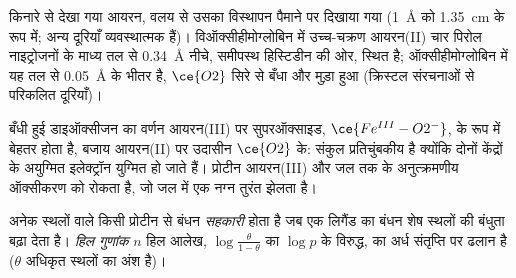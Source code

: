 \begin{omfigure}

{\small किनारे से देखा गया  आयरन, वलय से उसका विस्थापन पैमाने पर
दिखाया गया (1~\AA{} को 1.35~cm के रूप में; अन्य दूरियाँ व्यवस्थात्मक हैं)। विऑक्सीहीमोग्लोबिन में उच्च-चक्रण आयरन(II)
चार पिरोल नाइट्रोजनों के माध्य तल से \qty{0.34}{\angstrom} नीचे,
समीपस्थ हिस्टिडीन की ओर, स्थित है; ऑक्सीहीमोग्लोबिन में यह तल से \qty{0.05}{\angstrom} के भीतर है, $\ce{O2}$
सिरे से बँधा और मुड़ा हुआ (क्रिस्टल संरचनाओं से परिकलित दूरियाँ)।}
\end{omfigure}

बँधी हुई डाइऑक्सीजन का वर्णन आयरन(III) पर सुपरऑक्साइड, $\ce{Fe^{III}-O2^-}$, के रूप में बेहतर होता है, बजाय
आयरन(II) पर उदासीन $\ce{O2}$ के: संकुल प्रतिचुंबकीय है क्योंकि दोनों केंद्रों के अयुग्मित
इलेक्ट्रॉन युग्मित हो जाते हैं। प्रोटीन आयरन(III) और जल तक के अनुत्क्रमणीय
ऑक्सीकरण को रोकता है, जो जल में एक नग्न  तुरंत झेलता
है।

\begin{definition}[सहकारी बंधन]\label{def:b3:bioinorganic:cooperativity}
अनेक स्थलों वाले किसी प्रोटीन से बंधन \emph{सहकारी} होता है
जब एक लिगैंड का बंधन शेष स्थलों की बंधुता बढ़ा
देता है। \emph{हिल गुणांक} $n$
हिल आलेख, $\log\frac{\theta}{1 - \theta}$ का $\log p$ के विरुद्ध, का अर्ध संतृप्ति पर ढलान है ($\theta$ अधिकृत स्थलों का
अंश है)।
\end{definition}

